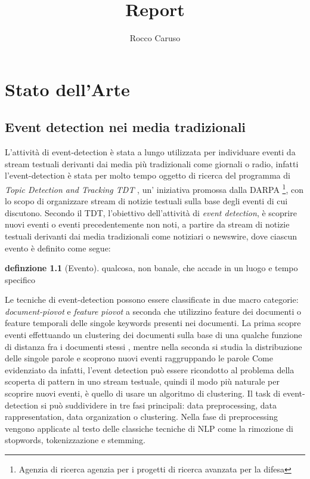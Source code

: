 \documentclass[a4paper,12pt]{report}
\title{Report}
\author{Rocco Caruso}
\begin{document}
\theoremstyle{definition}
\newtheorem{definizione}{definzione}
\newtheorem{teorema}{Teorema}
\maketitle
\graphicspath{ {./immagini/} }%
 
\chapter{Stato dell'Arte} 
\section{Event detection nei media tradizionali}
L'attività di event-detection è stata a lungo utilizzata per individuare eventi da stream testuali derivanti dai media più tradizionali come giornali o radio, infatti l'event-detection è stata per molto tempo oggetto di ricerca del programma di \emph{Topic Detection and Tracking TDT} \cite{Allan:2002:TDT:772260}, un' iniziativa	promossa dalla DARPA \footnote{Agenzia di ricerca agenzia per i progetti di ricerca avanzata per la difesa}, con lo scopo di organizzare stream di notizie testuali sulla base degli eventi di cui discutono. Secondo il TDT, l'obiettivo dell'attività di \emph{event detection}, è scoprire nuovi  eventi o eventi precedentemente non noti, a partire da stream di notizie testuali derivanti dai media tradizionali come notiziari o newswire, dove ciascun evento è definito come segue:
\begin{definizione}[Evento]
\label{def:evento}
qualcosa, non banale, che accade in un luogo e tempo specifico
\end{definizione}
 Le tecniche di event-detection possono essere classificate in due macro categorie: \emph{document-piovot} e \emph{feature piovot} a seconda che utilizzino feature dei documenti o feature temporali delle singole keywords presenti nei documenti. 
La prima scopre eventi effettuando un clustering dei documenti sulla base di una qualche funzione di distanza fra i documenti stessi \cite{Yang:1998:SRO:290941.290953}, mentre nella seconda si studia la distribuzione delle singole parole e scoprono nuovi eventi raggruppando le parole \cite{Kleinberg:2002:BHS:775047.775061} 
Come evidenziato da \cite{Yang:1998:SRO:290941.290953} infatti, l'event detection può essere ricondotto al problema della scoperta di pattern in uno stream testuale, quindi il modo più naturale per scoprire nuovi eventi, è quello di usare un algoritmo di clustering. Il task di event-detection si può suddividere in tre fasi principali: data preprocessing, data rappresentation, data organization o clustering. Nella fase di preprocessing vengono applicate al testo delle classiche tecniche di NLP come la rimozione di stopwords, tokenizzazione e stemming.
\end{document}
